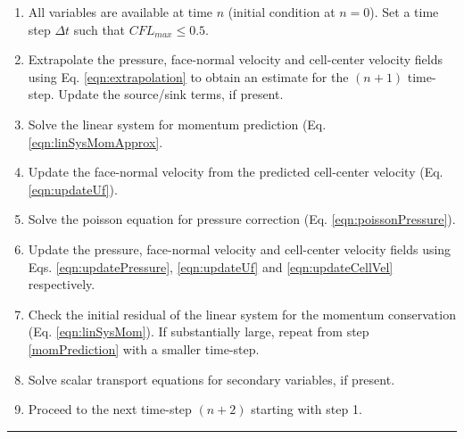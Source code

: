 \begin{enumerate}
\item All variables are available at time $n$ (initial condition at $n=0$). Set a time step $\Delta t$ such that $CFL_{max} \leqslant 0.5$. 

\item Extrapolate the pressure, face-normal velocity and cell-center velocity fields using Eq. \eqref{eqn:extrapolation} to obtain an estimate for the $(n+1)$ time-step. Update the source/sink terms, if present.
\label{momPrediction}

\item Solve the linear system for momentum prediction (Eq. \eqref{eqn:linSysMomApprox}.

\item Update the face-normal velocity from the predicted cell-center velocity (Eq. \eqref{eqn:updateUf}).

\item Solve the poisson equation for pressure correction (Eq. \eqref{eqn:poissonPressure}).

\item Update the pressure, face-normal velocity and cell-center velocity fields using Eqs. \eqref{eqn:updatePressure}, \eqref{eqn:updateUf} and \eqref{eqn:updateCellVel} respectively.

\item Check the initial residual of the linear system for the momentum conservation (Eq. \eqref{eqn:linSysMom}). If substantially large, repeat from step \ref{momPrediction} with a smaller time-step.

\item Solve scalar transport equations for secondary variables, if present.

\item Proceed to the next time-step $(n+2)$ starting with step 1. 

\end{enumerate}
\rule{\textwidth}{1pt}


